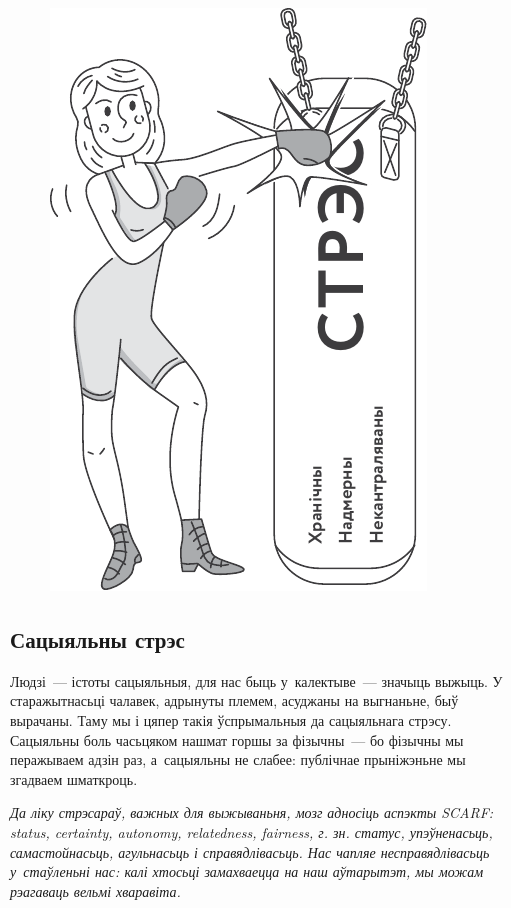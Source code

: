 \begin{figure}[htb!]
  \centering
  \includegraphics[scale=1.1]{willpower/ch7/1.pdf}
\end{figure}

\subsection*{Сацыяльны стрэс}

Людзі~--- істоты сацыяльныя, для нас быць у~калектыве~--- значыць выжыць. У старажытнасьці чалавек, адрынуты племем, асуджаны на выгнаньне, быў вырачаны. Таму мы і цяпер такія ўспрымальныя да сацыяльнага стрэсу. Сацыяльны боль часьцяком нашмат горшы за фізычны~--- бо фізычны мы перажываем адзін раз, а~сацыяльны не слабее: публічнае прыніжэньне мы згадваем шматкроць.

\emph{Да ліку стрэсараў, важных для выжываньня, мозг адносіць аспэкты SCARF: status, certainty, autonomy, relatedness, fairness, г. зн. статус, упэўненасьць, самастойнасьць, агульнасьць і справядлівасьць. Нас чапляе несправядлівасьць у~стаўленьні нас: калі хтосьці замахваецца на наш аўтарытэт, мы можам рэагаваць вельмі хваравіта.}

